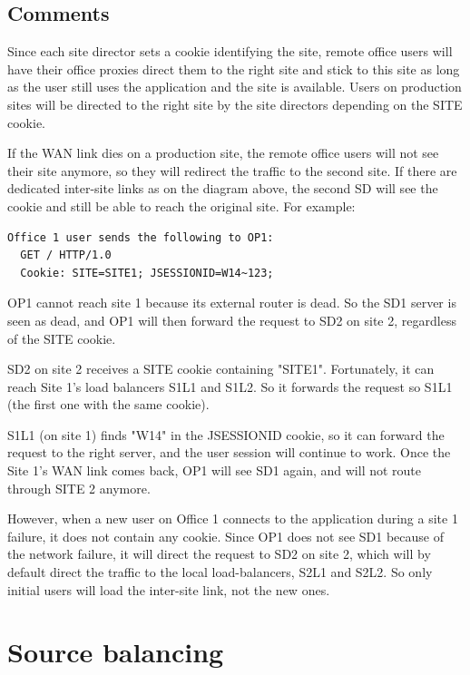 \subsection{Comments}

Since each site director sets a cookie identifying the site, remote office
users will have their office proxies direct them to the right site and stick
to this site as long as the user still uses the application and the site is
available. Users on production sites will be directed to the right site by the
site directors depending on the SITE cookie.

If the WAN link dies on a production site, the remote office users will not
see their site anymore, so they will redirect the traffic to the second site.
If there are dedicated inter-site links as on the diagram above, the second
SD will see the cookie and still be able to reach the original site. For
example:

\begin{verbatim}
Office 1 user sends the following to OP1:
  GET / HTTP/1.0
  Cookie: SITE=SITE1; JSESSIONID=W14~123;
\end{verbatim}

OP1 cannot reach site 1 because its external router is dead. So the SD1 server
is seen as dead, and OP1 will then forward the request to SD2 on site 2,
regardless of the SITE cookie.

SD2 on site 2 receives a SITE cookie containing "SITE1". Fortunately, it
can reach Site 1's load balancers S1L1 and S1L2. So it forwards the request
so S1L1 (the first one with the same cookie).

S1L1 (on site 1) finds "W14" in the JSESSIONID cookie, so it can forward the
request to the right server, and the user session will continue to work. Once
the Site 1's WAN link comes back, OP1 will see SD1 again, and will not route
through SITE 2 anymore.

However, when a new user on Office 1 connects to the application during a
site 1 failure, it does not contain any cookie. Since OP1 does not see SD1
because of the network failure, it will direct the request to SD2 on site 2,
which will by default direct the traffic to the local load-balancers, S2L1 and
S2L2. So only initial users will load the inter-site link, not the new ones.

\section{Source balancing}
\label{sec:source_balancing}

